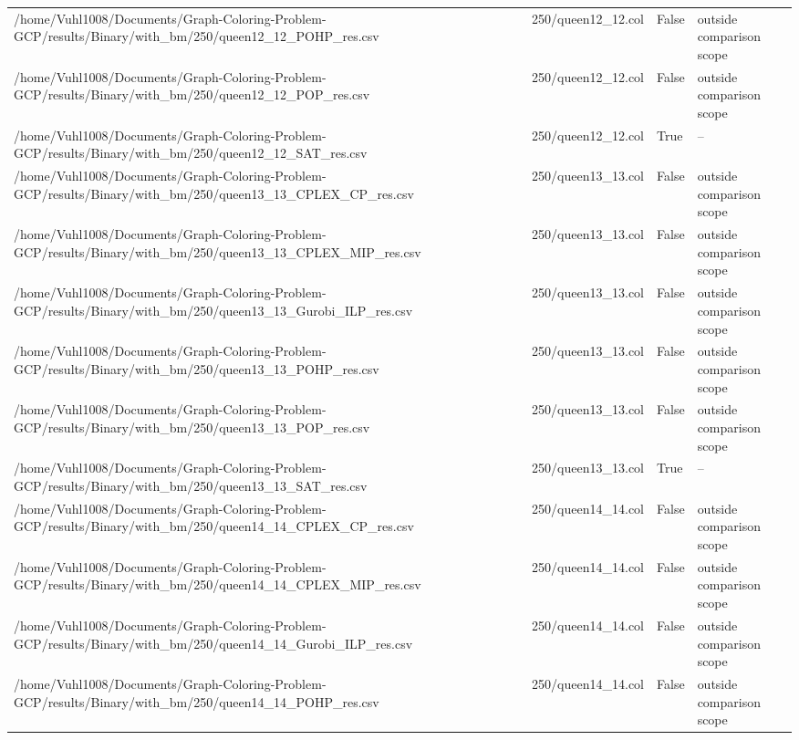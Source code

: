 \begin{table}[htbp]
\begin{tabular}{llll}
/home/Vuhl1008/Documents/Graph-Coloring-Problem-GCP/results/Binary/with\_bm/250/queen12\_12\_POHP\_res.csv & 250/queen12\_12.col & False & outside comparison scope \\
/home/Vuhl1008/Documents/Graph-Coloring-Problem-GCP/results/Binary/with\_bm/250/queen12\_12\_POP\_res.csv & 250/queen12\_12.col & False & outside comparison scope \\
/home/Vuhl1008/Documents/Graph-Coloring-Problem-GCP/results/Binary/with\_bm/250/queen12\_12\_SAT\_res.csv & 250/queen12\_12.col & True & -- \\
/home/Vuhl1008/Documents/Graph-Coloring-Problem-GCP/results/Binary/with\_bm/250/queen13\_13\_CPLEX\_CP\_res.csv & 250/queen13\_13.col & False & outside comparison scope \\
/home/Vuhl1008/Documents/Graph-Coloring-Problem-GCP/results/Binary/with\_bm/250/queen13\_13\_CPLEX\_MIP\_res.csv & 250/queen13\_13.col & False & outside comparison scope \\
/home/Vuhl1008/Documents/Graph-Coloring-Problem-GCP/results/Binary/with\_bm/250/queen13\_13\_Gurobi\_ILP\_res.csv & 250/queen13\_13.col & False & outside comparison scope \\
/home/Vuhl1008/Documents/Graph-Coloring-Problem-GCP/results/Binary/with\_bm/250/queen13\_13\_POHP\_res.csv & 250/queen13\_13.col & False & outside comparison scope \\
/home/Vuhl1008/Documents/Graph-Coloring-Problem-GCP/results/Binary/with\_bm/250/queen13\_13\_POP\_res.csv & 250/queen13\_13.col & False & outside comparison scope \\
/home/Vuhl1008/Documents/Graph-Coloring-Problem-GCP/results/Binary/with\_bm/250/queen13\_13\_SAT\_res.csv & 250/queen13\_13.col & True & -- \\
/home/Vuhl1008/Documents/Graph-Coloring-Problem-GCP/results/Binary/with\_bm/250/queen14\_14\_CPLEX\_CP\_res.csv & 250/queen14\_14.col & False & outside comparison scope \\
/home/Vuhl1008/Documents/Graph-Coloring-Problem-GCP/results/Binary/with\_bm/250/queen14\_14\_CPLEX\_MIP\_res.csv & 250/queen14\_14.col & False & outside comparison scope \\
/home/Vuhl1008/Documents/Graph-Coloring-Problem-GCP/results/Binary/with\_bm/250/queen14\_14\_Gurobi\_ILP\_res.csv & 250/queen14\_14.col & False & outside comparison scope \\
/home/Vuhl1008/Documents/Graph-Coloring-Problem-GCP/results/Binary/with\_bm/250/queen14\_14\_POHP\_res.csv & 250/queen14\_14.col & False & outside comparison scope \\

\end{tabular}
\end{table}
